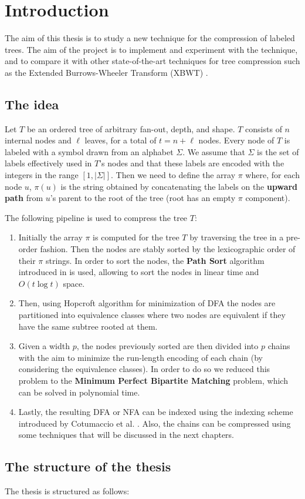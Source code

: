 \chapter{Introduction}
The aim of this thesis is to study a new technique for the compression of labeled trees. The aim of the project is to implement and experiment with the technique, and to compare it with other state-of-the-art techniques for tree compression such as the Extended Burrows-Wheeler Transform (XBWT) \cite{ferragina2009compressing}. 

\section{The idea}
Let $ T $ be an ordered tree of arbitrary fan-out, depth, and shape. $ T $ consists of $ n $ internal nodes and $ \ell $ leaves, for a total of $ t = n + \ell $ nodes. Every node of $ T $ is labeled with a symbol drawn from an alphabet $ \Sigma $. We assume that $ \Sigma $ is the set of labels effectively used in $ T $'s nodes and that these labels are encoded with the integers in the range $[1, |\Sigma|]$. Then we need to define the array $\pi$ where, for each node $u$, $\pi(u)$ is the string obtained by concatenating the labels on the \textbf{upward path} from $u$'s parent to the root of the tree (root has an empty $\pi$ component).

The following pipeline is used to compress the tree $T$:

\begin{enumerate}
    \item Initially the array $\pi$ is computed for the tree $T$ by traversing the tree in a pre-order fashion. Then the nodes are stably sorted by the lexicographic order of their $\pi$ strings. In order to sort the nodes, the \textbf{Path Sort} algorithm introduced in \cite{ferragina2009compressing} is used, allowing to sort the nodes in linear time and $O(t \log t)$ space.
    \item Then, using Hopcroft algorithm for minimization of DFA \cite{HOPCROFT1971189} the nodes are partitioned into equivalence classes where two nodes are equivalent if they have the same subtree rooted at them. 
    \item Given a width $p$, the nodes previously sorted are then divided into $p$ chains with the aim to minimize the run-length encoding of each chain (by considering the equivalence classes). In order to do so we reduced this problem to the \textbf{Minimum Perfect Bipartite Matching} problem, which can be solved in polynomial time.
    \item Lastly, the resulting DFA or NFA can be indexed using the indexing scheme introduced by Cotumaccio et al. \cite{cotumaccio2023co}. Also, the chains can be compressed using some techniques that will be discussed in the next chapters.
\end{enumerate}

\section{The structure of the thesis}
The thesis is structured as follows:
